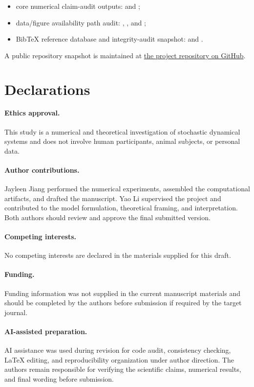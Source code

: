 \documentclass[11pt,a4paper]{article}
\theoremstyle{definition}
\numberwithin{equation}{section}   %
\begin{document}
\begin{itemize}[leftmargin=*]
  \item core numerical claim-audit outputs:
   and
  ;
  \item data/figure availability path audit:
  ,
  , and
  ;
  \item BibTeX reference database and integrity-audit snapshot:
   and
  .
\end{itemize}
\endgroup
A public repository snapshot is maintained at
\href{https://github.com/jayleenjiang/nls-energy-cascade}{the project
repository on GitHub}.

\section*{Declarations}

\paragraph{Ethics approval.}
This study is a numerical and theoretical investigation of stochastic
dynamical systems and does not involve human participants, animal subjects, or
personal data.

\paragraph{Author contributions.}
Jayleen Jiang performed the numerical experiments, assembled the computational
artifacts, and drafted the manuscript. Yao Li supervised the project and
contributed to the model formulation, theoretical framing, and interpretation.
Both authors should review and approve the final submitted version.

\paragraph{Competing interests.}
No competing interests are declared in the materials supplied for this draft.

\paragraph{Funding.}
Funding information was not supplied in the current manuscript materials and
should be completed by the authors before submission if required by the target
journal.

\paragraph{AI-assisted preparation.}
AI assistance was used during revision for code audit, consistency checking,
LaTeX editing, and reproducibility organization under author direction. The
authors remain responsible for verifying the scientific claims, numerical
results, and final wording before submission.



\end{document}
